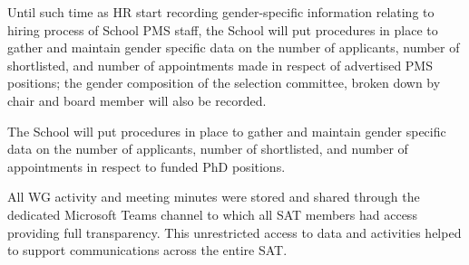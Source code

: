 \newcommand{\actrecordhiringpms}{Until such time as HR start recording gender-specific information relating to hiring process of School PMS staff, the School will put procedures in place to gather and maintain gender specific data on the number of applicants, number of shortlisted, and number of appointments made in respect of advertised PMS positions; the gender composition of the selection committee, broken down by chair and board member will also be recorded.
}
\begin{action}[label=action:record:hiring:pms]{}
\actrecordhiringpms
\hfill{
    \hypersetup{hidelinks}
    \hyperlink{aa0}{\gotoactionsymbol{}}
}
\end{action}




\newcommand{\actrecordhiringphd}{The School will put procedures in place to gather and maintain gender specific data on the number of applicants, number of shortlisted, and number of appointments in respect to funded PhD positions.
}
\begin{action}[label=action:record:hiring:phd]{}
\actrecordhiringphd
\hfill{
    \hypersetup{hidelinks}
    \hyperlink{aa0}{\gotoactionsymbol{}}
}
\end{action}

All WG activity and meeting minutes were stored and shared through the dedicated Microsoft Teams channel to which all SAT members had access providing full transparency.
This unrestricted access to data and activities helped to support communications across the entire SAT. 

